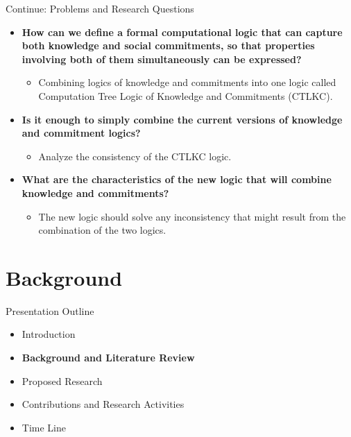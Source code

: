 \documentclass{beamer}
\begin{document}
\begin{frame}{Continue: Problems and Research Questions}
 \begin{itemize}
   \item \textbf{How can we define a formal computational logic that can capture both knowledge and social commitments, so that properties involving both of them simultaneously can be expressed?}
        \begin{itemize}
         \item Combining logics of knowledge and commitments into one logic called Computation Tree Logic of Knowledge and Commitments (CTLKC).
        \end{itemize}
    \item \textbf{Is it enough to simply combine the current versions of knowledge and commitment logics?}
        \begin{itemize}
         \item Analyze the consistency of the CTLKC logic.
        \end{itemize}
    \item \textbf{What are the characteristics of the new logic that will combine knowledge and commitments?}
        \begin{itemize}
         \item The new logic should solve any inconsistency that might result from the combination of the two logics.
        \end{itemize}
\end{itemize}
\end{frame}

\section{Background}
\begin{frame}{Presentation Outline}
    \begin{itemize}
     	\itemsep=.5cm
    	\item Introduction
    	\item {\bf Background and Literature Review}
    	\item Proposed Research
        \item Contributions and Research Activities
    	\item Time Line
    \end{itemize}
\end{frame}
\end{document}
